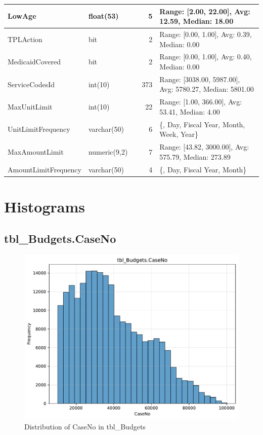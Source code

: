 \begin{landscape}
\begin{longtable}{|l|l|l|r|p{6cm}|}
\hline
LowAge & float(53) &  & 5 & Range: [2.00, 22.00], Avg: 12.59, Median: 18.00 \\
\hline
TPLAction & bit &  & 2 & Range: [0.00, 1.00], Avg: 0.39, Median: 0.00 \\
\hline
MedicaidCovered & bit &  & 2 & Range: [0.00, 1.00], Avg: 0.40, Median: 0.00 \\
\hline
ServiceCodesId & int(10) &  & 373 & Range: [3038.00, 5987.00], Avg: 5780.27, Median: 5801.00 \\
\hline
MaxUnitLimit & int(10) &  & 22 & Range: [1.00, 366.00], Avg: 53.41, Median: 4.00 \\
\hline
UnitLimitFrequency & varchar(50) &  & 6 & \{, Day, Fiscal Year, Month, Week, Year\} \\
\hline
MaxAmountLimit & numeric(9,2) &  & 7 & Range: [43.82, 3000.00], Avg: 575.79, Median: 273.89 \\
\hline
AmountLimitFrequency & varchar(50) &  & 4 & \{, Day, Fiscal Year, Month\} \\
\hline
\end{longtable}

\end{landscape}

\newpage \section{Histograms}

\subsection{tbl\_Budgets.CaseNo}

\begin{figure}[htbp]
\centering
\includegraphics[width=\textwidth]{figures/dbo_tbl_Budgets_CaseNo.pdf}
\caption{Distribution of CaseNo in tbl\_Budgets}
\end{figure}\newpage


